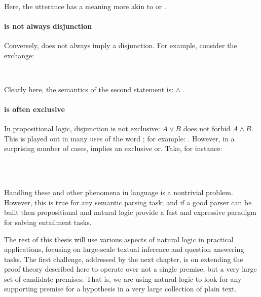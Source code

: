 \begin{displayquote}
 \\
\end{displayquote}

Here, the utterance  has a meaning more akin to
   or .


\paragraph{ is not always disjunction}
Conversely,  does not always imply a disjunction.
For example, consider the exchange:

\begin{displayquote}
 \\
\end{displayquote}

Clearly here, the semantics of the second statement is: 
   $\land$ .


\paragraph{ is often exclusive}
In propositional logic, disjunction is not exclusive: $A \lor B$ does not
  forbid $A \land B$.
This is played out in many uses of the word ; for example:
  .
However, in a surprising number of cases,  implies an exclusive or.
Take, for instance:

\begin{displayquote}
 \\
 \\
\end{displayquote}

Handling these and other phenomena in language is a nontrivial problem.
However, this is true for any semantic parsing task; and if a good parser can be built
  then propositional and natural logic provide a fast and expressive paradigm for solving
  entailment tasks.

The rest of this thesis will use various aspects of natural logic in practical applications,
  focusing on large-scale textual inference and question answering tasks.
The first challenge, addressed by the next chapter, is on extending the proof theory described
  here to operate over not a single premise, but a very large set of candidate premises.
That is, we are using natural logic to look for any supporting premise for a hypothesis 
  in a very large collection of plain text.


